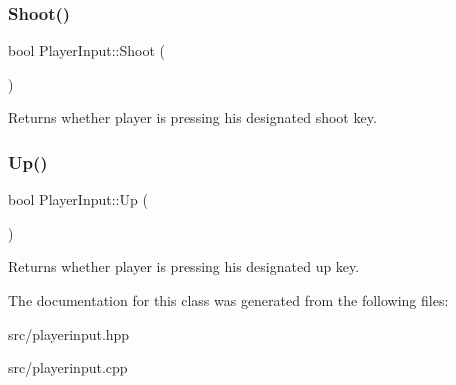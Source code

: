 \subsubsection{\texorpdfstring{Shoot()}{Shoot()}}
{\footnotesize\ttfamily bool Player\+Input\+::\+Shoot (\begin{DoxyParamCaption}{ }\end{DoxyParamCaption})}

Returns whether player is pressing his designated shoot key. \hypertarget{classPlayerInput_a2cd0fa6c370da0294219c326d251ba75}{}\label{classPlayerInput_a2cd0fa6c370da0294219c326d251ba75} 
\subsubsection{\texorpdfstring{Up()}{Up()}}
{\footnotesize\ttfamily bool Player\+Input\+::\+Up (\begin{DoxyParamCaption}{ }\end{DoxyParamCaption})}

Returns whether player is pressing his designated up key. 

The documentation for this class was generated from the following files\+:\begin{DoxyCompactItemize}
\item 
src/playerinput.\+hpp\item 
src/playerinput.\+cpp\end{DoxyCompactItemize}
